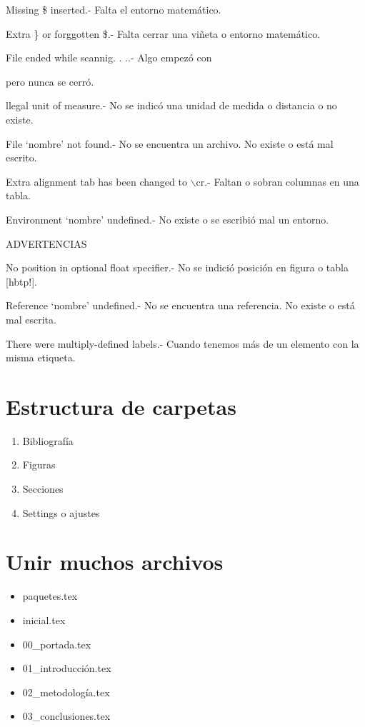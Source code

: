 \documentclass[a4paper, 12pt]{article}
\begin{document}
		Missing \$ inserted.- Falta el entorno matemático.
	
		Extra \} or forggotten \$.- Falta cerrar una viñeta o entorno matemático.
	
		File ended while scannig. . ..- Algo empezó con { pero nunca se cerró.
		
		llegal unit of measure.- No se indicó una unidad de medida o distancia o no existe.
		
		File ‘nombre’ not found.- No se encuentra un archivo. No existe o está mal escrito.
		
		Extra alignment tab has been changed to $\backslash$cr.- Faltan o sobran columnas en una tabla.
		
		Environment ‘nombre’ undefined.- No existe o se escribió mal un entorno.\newline
		
		ADVERTENCIAS
		
		No position in optional float specifier.- No se indició posición en figura o tabla [hbtp!].
		
		Reference ‘nombre’ undefined.- No se encuentra una referencia. No existe o está mal escrita.
		
		There were multiply-defined labels.- Cuando tenemos más de un elemento con la misma etiqueta.
		
		\section{Estructura de carpetas}
		\begin{enumerate}
			\item Bibliografía
			\item Figuras
			\item Secciones
			\item Settings o ajustes
		\end{enumerate}
		
		\section{Unir muchos archivos}
		
		\begin{itemize}
			\item paquetes.tex
			\item inicial.tex
			\item 00\_portada.tex
			\item 01\_introducción.tex
			\item 02\_metodología.tex
			\item 03\_conclusiones.tex
		\end{itemize}
		
}
\end{document}
